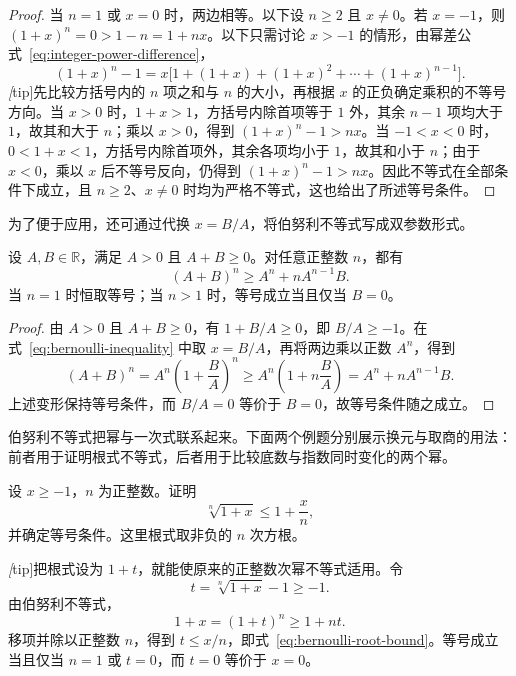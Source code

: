 \documentclass[UTF8,12pt,a4paper,fontset=fandol]{ctexbook}
\begin{document}
\begin{proof}
当 $n=1$ 或 $x=0$ 时，两边相等。以下设 $n\geq2$ 且 $x\neq0$。若 $x=-1$，则 $(1+x)^n=0>1-n=1+nx$。以下只需讨论 $x>-1$ 的情形，由幂差公式~\eqref{eq:integer-power-difference}，
\[
    (1+x)^n-1
    =x\bigl[1+(1+x)+(1+x)^2+\cdots+(1+x)^{n-1}\bigr].
\]
\emph[tip]{先比较方括号内的 $n$ 项之和与 $n$ 的大小，再根据 $x$ 的正负确定乘积的不等号方向。}当 $x>0$ 时，$1+x>1$，方括号内除首项等于 $1$ 外，其余 $n-1$ 项均大于 $1$，故其和大于 $n$；乘以 $x>0$，得到 $(1+x)^n-1>nx$。当 $-1<x<0$ 时，$0<1+x<1$，方括号内除首项外，其余各项均小于 $1$，故其和小于 $n$；由于 $x<0$，乘以 $x$ 后不等号反向，仍得到 $(1+x)^n-1>nx$。因此不等式在全部条件下成立，且 $n\geq2$、$x\neq0$ 时均为严格不等式，这也给出了所述等号条件。
\end{proof}

为了便于应用，还可通过代换 $x=B/A$，将伯努利不等式写成双参数形式。

\begin{corollary}[伯努利不等式的双参数形式]
\label{cor:two-parameter-bernoulli}
设 $A,B\in\mathbb{R}$，满足 $A>0$ 且 $A+B\geq0$。对任意正整数 $n$，都有
\begin{equation}
    (A+B)^n\geq A^n+nA^{n-1}B.
    \label{eq:two-parameter-bernoulli}
\end{equation}
当 $n=1$ 时恒取等号；当 $n>1$ 时，等号成立当且仅当 $B=0$。
\end{corollary}

\begin{proof}
由 $A>0$ 且 $A+B\geq0$，有 $1+B/A\geq0$，即 $B/A\geq-1$。在式~\eqref{eq:bernoulli-inequality} 中取 $x=B/A$，再将两边乘以正数 $A^n$，得到
\[
    (A+B)^n=A^n\left(1+\frac BA\right)^n
    \geq A^n\left(1+n\frac BA\right)
    =A^n+nA^{n-1}B.
\]
上述变形保持等号条件，而 $B/A=0$ 等价于 $B=0$，故等号条件随之成立。
\end{proof}

伯努利不等式把幂与一次式联系起来。下面两个例题分别展示换元与取商的用法：前者用于证明根式不等式，后者用于比较底数与指数同时变化的两个幂。

\begin{example}
\label{ex:bernoulli-root-bound}
设 $x\geq-1$，$n$ 为正整数。证明
\begin{equation}
    \sqrt[n]{1+x}\leq1+\frac xn,
    \label{eq:bernoulli-root-bound}
\end{equation}
并确定等号条件。这里根式取非负的 $n$ 次方根。
\end{example}

\begin{solve}
\emph[tip]{把根式设为 $1+t$，就能使原来的正整数次幂不等式适用。}令
\[
    t=\sqrt[n]{1+x}-1\geq-1.
\]
由伯努利不等式，
\[
    1+x=(1+t)^n\geq1+nt.
\]
移项并除以正整数 $n$，得到 $t\leq x/n$，即式~\eqref{eq:bernoulli-root-bound}。等号成立当且仅当 $n=1$ 或 $t=0$，而 $t=0$ 等价于 $x=0$。
\end{solve}
\end{document}
